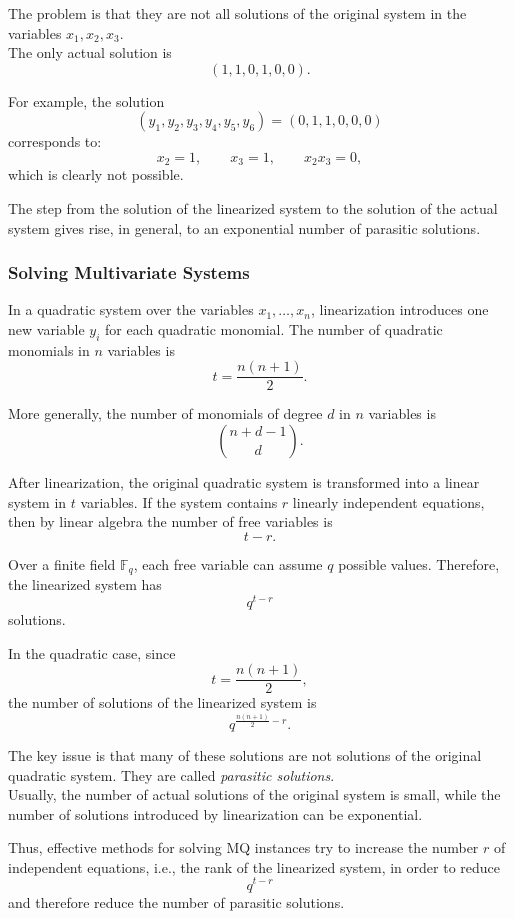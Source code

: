 \noindent
The problem is that they are not all solutions of the original system in the variables
$x_1,x_2,x_3$.\\
The only actual solution is
\[
(1,1,0,1,0,0).
\]
\bigskip

\noindent
For example, the solution
\[
(y_1,y_2,y_3,y_4,y_5,y_6)=(0,1,1,0,0,0)
\]
corresponds to:
\[
x_2=1,\qquad x_3=1,\qquad x_2x_3=0,
\]
which is clearly not possible.

\bigskip

\noindent
The step from the solution of the linearized system to the solution of the actual system gives rise, in general, to an exponential number of parasitic solutions.

\subsubsection{Solving Multivariate Systems}
In a quadratic system over the variables \(x_1,\dots,x_n\), linearization introduces one new variable \(y_i\) for each quadratic monomial. The number of quadratic monomials in \(n\) variables is
\[
t=\frac{n(n+1)}{2}.
\]

\noindent
More generally, the number of monomials of degree \(d\) in \(n\) variables is
\[
\binom{n+d-1}{d}.
\]

\noindent
After linearization, the original quadratic system is transformed into a linear system in \(t\) variables. If the system contains \(r\) linearly independent equations, then by linear algebra the number of free variables is
\[
t-r.
\]

\noindent
Over a finite field \(\mathbb F_q\), each free variable can assume \(q\) possible values. Therefore, the linearized system has
\[
q^{t-r}
\]
solutions.
\medskip

\noindent
In the quadratic case, since
\[
t=\frac{n(n+1)}{2},
\]
the number of solutions of the linearized system is
\[
q^{\frac{n(n+1)}{2}-r}.
\]

\noindent
The key issue is that many of these solutions are not solutions of the original quadratic system. They are called \textit{parasitic solutions}.\\
Usually, the number of actual solutions of the original system is small, while the number of solutions introduced by linearization can be exponential.
\medskip

\noindent
Thus, effective methods for solving MQ instances try to increase the number \(r\) of independent equations, i.e., the rank of the linearized system, in order to reduce
\[
q^{t-r}
\]
and therefore reduce the number of parasitic solutions.

